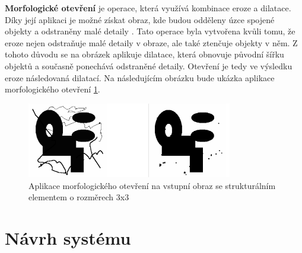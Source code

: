 \textbf{Morfologické otevření} je operace, která využívá kombinace eroze a dilatace. Díky její aplikaci je možné získat obraz, kde budou odděleny úzce spojené objekty a odstraněny malé detaily \cite{morphology_opening}. Tato operace byla vytvořena kvůli tomu, že eroze nejen odstraňuje malé detaily v obraze, ale také ztenčuje objekty v něm. Z tohoto důvodu se na obrázek aplikuje dilatace, která obnovuje původní šířku objektů a současně ponechává odstraněné detaily. Otevření je tedy ve výsledku eroze následovaná dilatací. Na následujícím obrázku bude ukázka aplikace morfologického otevření \ref{aplikace_otevreni}.

\begin{figure}[h]
	\centering
	\includegraphics[width=0.8\textwidth]{obrazky/otevreni_ukazka.png}
	\caption{Aplikace morfologického otevření na vstupní obraz se strukturálním elementem o rozměrech 3x3 \cite{morfologie}}
	\label{aplikace_otevreni}
\end{figure}

\section{Návrh systému}

